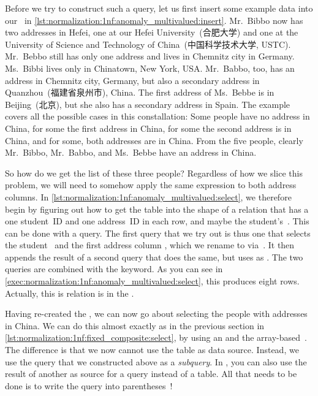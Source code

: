 Before we try to construct such a query, let us first insert some example data into our \db\ in \cref{lst:normalization:1nf:anomaly_multivalued:insert}.
Mr.~Bibbo now has two addresses in Hefei, one at our Hefei University~(合肥大学) and one at the University of Science and Technology of China~(中国科学技术大学, USTC).
Mr.~Bebbo still has only one address and lives in Chemnitz city in Germany.
Ms.~Bibbi lives only in Chinatown, New York, USA.
Mr.~Babbo, too, has an address in Chemnitz city, Germany, but also a secondary address in Quanzhou~(福建省泉州市), China.
The first address of Ms.~Bebbe is in Beijing~(北京), but she also has a secondary address in Spain.
The example covers all the possible cases in this constallation:
Some people have no address in China, for some the first address in China, for some the second address is in China, and for some, both addresses are in China.
From the five people, clearly Mr.~Bibbo, Mr.~Babbo, and Ms.~Bebbe have an address in China.

So how do we get the list of these three people?
Regardless of how we slice this problem, we will need to somehow apply the same expression to both address columns.
In \cref{lst:normalization:1nf:anomaly_multivalued:select}, we therefore begin by figuring out how to get the table into the shape of a relation that has a one student~ID and one address~ID in each row, and maybe the student's~.
This can be done with a  query.
The first query that we try out is thus one that selects the student~ and the first address column , which we rename to  via~.
It then appends the result of a second query that does the same, but uses  as .
The two queries are combined with the  keyword.
As you can see in \cref{exec:normalization:1nf:anomaly_multivalued:select}, this produces eight rows.
Actually, this is relation is in the .

Having re-created the , we can now go about selecting the people with addresses in China.
We can do this almost exactly as in the previous section in \cref{lst:normalization:1nf:fixed_composite:select}, by using an  and the array-based~.
The difference is that we now cannot use the  table as data source.
Instead, we use the  query that we constructed above as a \emph{subquery}.
In \sql, you can also use the result of another  as source for a query instead of a table.
All that needs to be done is to write the query into parentheses~\sqlIdx{(\idxdots)}!

